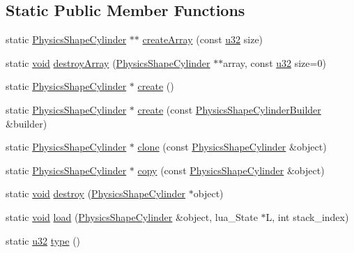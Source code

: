 \subsection*{Static Public Member Functions}
\begin{DoxyCompactItemize}
\item 
static \mbox{\hyperlink{classnjli_1_1_physics_shape_cylinder}{Physics\+Shape\+Cylinder}} $\ast$$\ast$ \mbox{\hyperlink{classnjli_1_1_physics_shape_cylinder_a85f5ae5b9a6df49f9b6235ca37fe7496}{create\+Array}} (const \mbox{\hyperlink{_util_8h_a10e94b422ef0c20dcdec20d31a1f5049}{u32}} size)
\item 
static \mbox{\hyperlink{_thread_8h_af1e856da2e658414cb2456cb6f7ebc66}{void}} \mbox{\hyperlink{classnjli_1_1_physics_shape_cylinder_a206e5561c42493f64037429253d5b715}{destroy\+Array}} (\mbox{\hyperlink{classnjli_1_1_physics_shape_cylinder}{Physics\+Shape\+Cylinder}} $\ast$$\ast$array, const \mbox{\hyperlink{_util_8h_a10e94b422ef0c20dcdec20d31a1f5049}{u32}} size=0)
\item 
static \mbox{\hyperlink{classnjli_1_1_physics_shape_cylinder}{Physics\+Shape\+Cylinder}} $\ast$ \mbox{\hyperlink{classnjli_1_1_physics_shape_cylinder_a1c47189018afd4ce17ebc2628ccf4288}{create}} ()
\item 
static \mbox{\hyperlink{classnjli_1_1_physics_shape_cylinder}{Physics\+Shape\+Cylinder}} $\ast$ \mbox{\hyperlink{classnjli_1_1_physics_shape_cylinder_a50af85972d00bad9e0ea3cb6df4636e3}{create}} (const \mbox{\hyperlink{classnjli_1_1_physics_shape_cylinder_builder}{Physics\+Shape\+Cylinder\+Builder}} \&builder)
\item 
static \mbox{\hyperlink{classnjli_1_1_physics_shape_cylinder}{Physics\+Shape\+Cylinder}} $\ast$ \mbox{\hyperlink{classnjli_1_1_physics_shape_cylinder_a00d9bbd12c316e95087402a703fbfe17}{clone}} (const \mbox{\hyperlink{classnjli_1_1_physics_shape_cylinder}{Physics\+Shape\+Cylinder}} \&object)
\item 
static \mbox{\hyperlink{classnjli_1_1_physics_shape_cylinder}{Physics\+Shape\+Cylinder}} $\ast$ \mbox{\hyperlink{classnjli_1_1_physics_shape_cylinder_a0f46fea25774f8b6c9b5f11b662e2ea6}{copy}} (const \mbox{\hyperlink{classnjli_1_1_physics_shape_cylinder}{Physics\+Shape\+Cylinder}} \&object)
\item 
static \mbox{\hyperlink{_thread_8h_af1e856da2e658414cb2456cb6f7ebc66}{void}} \mbox{\hyperlink{classnjli_1_1_physics_shape_cylinder_a4af110c841b136ee56c4cd6185ab4633}{destroy}} (\mbox{\hyperlink{classnjli_1_1_physics_shape_cylinder}{Physics\+Shape\+Cylinder}} $\ast$object)
\item 
static \mbox{\hyperlink{_thread_8h_af1e856da2e658414cb2456cb6f7ebc66}{void}} \mbox{\hyperlink{classnjli_1_1_physics_shape_cylinder_a86823cfc30c2f53f5e6d93bad2c13d60}{load}} (\mbox{\hyperlink{classnjli_1_1_physics_shape_cylinder}{Physics\+Shape\+Cylinder}} \&object, lua\+\_\+\+State $\ast$L, int stack\+\_\+index)
\item 
static \mbox{\hyperlink{_util_8h_a10e94b422ef0c20dcdec20d31a1f5049}{u32}} \mbox{\hyperlink{classnjli_1_1_physics_shape_cylinder_a3a7aa75547f61cdfbb292e64ac18190a}{type}} ()
\end{DoxyCompactItemize}
